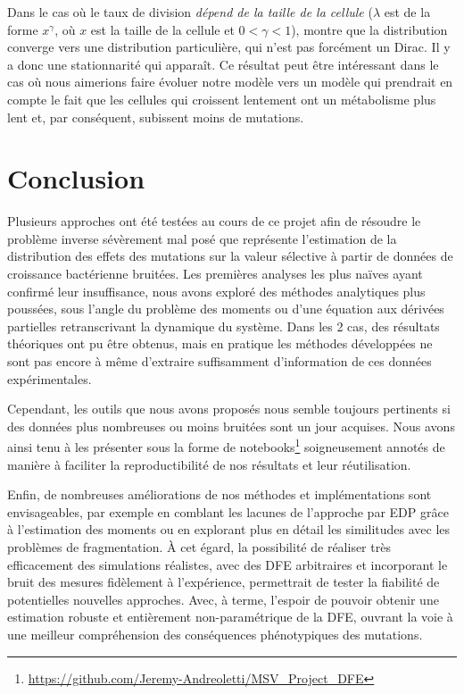 \documentclass[12pt]{article}
\newcounter{prop}[section]
\begin{document}
Dans le cas où le taux de division \emph{dépend de la taille de la cellule} ($\lambda$ est de la forme $x^{\gamma}$, où $x$ est la taille de la cellule et $0<\gamma<1$), \cite{md2} montre que la distribution converge vers une distribution particulière, qui n'est pas forcément un Dirac. Il y a donc une stationnarité qui apparaît. Ce résultat peut être intéressant dans le cas où nous aimerions faire évoluer notre modèle vers un modèle qui prendrait en compte le fait que les cellules qui croissent lentement ont un métabolisme plus lent et, par conséquent, subissent moins de mutations.



\section{Conclusion}

  Plusieurs approches ont été testées au cours de ce projet afin de résoudre le problème inverse sévèrement mal posé que représente l'estimation de la distribution des effets des mutations sur la valeur sélective à partir de données de croissance bactérienne bruitées. Les premières analyses les plus naïves ayant confirmé leur insuffisance, nous avons exploré des méthodes analytiques plus poussées, sous l'angle du problème des moments ou d'une équation aux dérivées partielles retranscrivant la dynamique du système. Dans les 2 cas, des résultats théoriques ont pu être obtenus, mais en pratique les méthodes développées ne sont pas encore à même d'extraire suffisamment d'information de ces données expérimentales.
  
  Cependant, les outils que nous avons proposés nous semble toujours pertinents si des données plus nombreuses ou moins bruitées sont un jour acquises. Nous avons ainsi tenu à les présenter sous la forme de notebooks\footnote{\url{https://github.com/Jeremy-Andreoletti/MSV_Project_DFE}} soigneusement annotés de manière à faciliter la reproductibilité de nos résultats et leur réutilisation.
  
  Enfin, de nombreuses améliorations de nos méthodes et implémentations sont envisageables, par exemple en comblant les lacunes de l'approche par EDP grâce à l'estimation des moments ou en explorant plus en détail les similitudes avec les problèmes de fragmentation. À cet égard, la possibilité de réaliser très efficacement des simulations réalistes, avec des DFE arbitraires et incorporant le bruit des mesures fidèlement à l'expérience, permettrait de tester la fiabilité de potentielles nouvelles approches. Avec, à terme, l'espoir de pouvoir obtenir une estimation robuste et entièrement non-paramétrique de la DFE, ouvrant la voie à une meilleur compréhension des conséquences phénotypiques des mutations.
  
\end{document}
